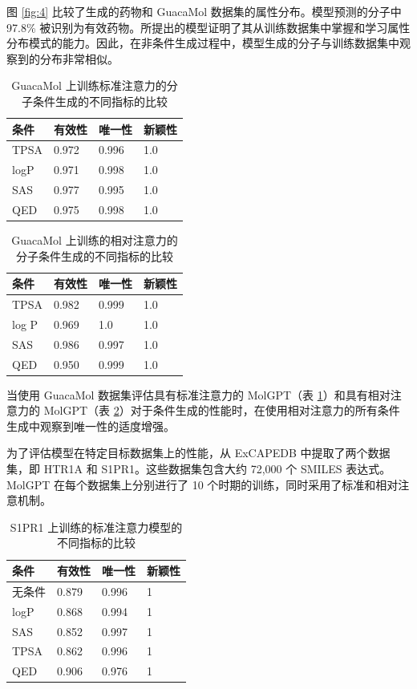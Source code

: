 \begin{translation}
图 \ref{fig:4} 比较了生成的药物和 GuacaMol 数据集的属性分布。模型预测的分子中 97.8\% 被识别为有效药物。所提出的模型证明了其从训练数据集中掌握和学习属性分布模式的能力。因此，在非条件生成过程中，模型生成的分子与训练数据集中观察到的分布非常相似。

\begin{table}[H]
  \centering
  \caption{GuacaMol 上训练标准注意力的分子条件生成的不同指标的比较}
  \label{tab:3}
  \begin{tabular}{llll}
    \hline 条件   & 有效性   & 唯一性   & 新颖性 \\
    \hline TPSA & 0.972 & 0.996 & 1.0 \\
    logP        & 0.971 & 0.998 & 1.0 \\
    SAS         & 0.977 & 0.995 & 1.0 \\
    QED         & 0.975 & 0.998 & 1.0 \\
    \hline
  \end{tabular}
\end{table}

\begin{table}[H]
  \centering
  \caption{GuacaMol 上训练的相对注意力的分子条件生成的不同指标的比较}
  \label{tab:4}
  \begin{tabular}{llll}
    \hline 条件   & 有效性   & 唯一性   & 新颖性 \\
    \hline TPSA & 0.982 & 0.999 & 1.0 \\
    log  P      & 0.969 & 1.0   & 1.0 \\
    SAS         & 0.986 & 0.997 & 1.0 \\
    QED         & 0.950 & 0.999 & 1.0 \\
    \hline
  \end{tabular}
\end{table}

当使用 GuacaMol 数据集评估具有标准注意力的 MolGPT（表 \ref{tab:3}）和具有相对注意力的 MolGPT（表 \ref{tab:4}）对于条件生成的性能时，在使用相对注意力的所有条件生成中观察到唯一性的适度增强。

为了评估模型在特定目标数据集上的性能，从 ExCAPEDB 中提取了两个数据集，即 HTR1A 和 S1PR1。这些数据集包含大约 72,000 个 SMILES 表达式。 MolGPT 在每个数据集上分别进行了 10 个时期的训练，同时采用了标准和相对注意机制。

\begin{table}[H]
  \centering
  \caption{S1PR1 上训练的标准注意力模型的不同指标的比较}
  \label{tab:5}
  \begin{tabular}{llll}
    \hline 条件  & 有效性   & 唯一性   & 新颖性 \\
    \hline 无条件 & 0.879 & 0.996 & 1   \\
    logP       & 0.868 & 0.994 & 1   \\
    SAS        & 0.852 & 0.997 & 1   \\
    TPSA       & 0.862 & 0.996 & 1   \\
    QED        & 0.906 & 0.976 & 1   \\
    \hline
  \end{tabular}
\end{table}



\end{translation}
